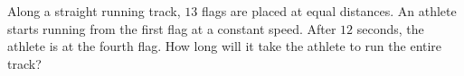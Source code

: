 Along a straight running track, $13$ flags are placed at equal distances. An athlete starts running from the first flag at a constant speed. After $12$ seconds, the athlete is at the fourth flag. How long will it take the athlete to run the entire track?
